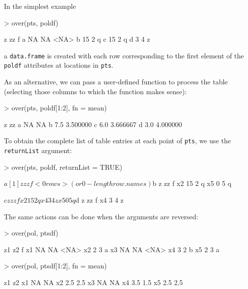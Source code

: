 \documentclass{article}
\newcommand{\code}[1]{{\tt #1}}
\begin{document}
In the simplest example 
\begin{Schunk}
\begin{Sinput}
> over(pts, poldf)
\end{Sinput}
\begin{Soutput}
   z zz    f
a NA NA <NA>
b 15  2    q
c 15  2    q
d  3  4    z
\end{Soutput}
\end{Schunk}
a \code{data.frame} is created with each row corresponding to
the first element of the \code{poldf} attributes at locations
in \code{pts}.

As an alternative, we can pass a user-defined function to process
the table (selecting those columns to which the function makes sense):
\begin{Schunk}
\begin{Sinput}
> over(pts, poldf[1:2], fn = mean)
\end{Sinput}
\begin{Soutput}
    z       zz
a  NA       NA
b 7.5 3.500000
c 6.0 3.666667
d 3.0 4.000000
\end{Soutput}
\end{Schunk}

To obtain the complete list of table entries at each point of \code{pts}, 
we use the \code{returnList} argument:
\begin{Schunk}
\begin{Sinput}
> over(pts, poldf, returnList = TRUE)
\end{Sinput}
\begin{Soutput}
$a
[1] z  zz f 
<0 rows> (or 0-length row.names)

$b
    z zz f
x2 15  2 q
x5  0  5 q

$c
    z zz f
x2 15  2 q
x4  3  4 z
x5  0  5 q

$d
   z zz f
x4 3  4 z
\end{Soutput}
\end{Schunk}

The same actions can be done when the arguments are reversed:
\begin{Schunk}
\begin{Sinput}
> over(pol, ptsdf)
\end{Sinput}
\begin{Soutput}
   z1 z2    f
x1 NA NA <NA>
x2  2  3    a
x3 NA NA <NA>
x4  3  2    b
x5  2  3    a
\end{Soutput}
\begin{Sinput}
> over(pol, ptsdf[1:2], fn = mean)
\end{Sinput}
\begin{Soutput}
    z1  z2
x1  NA  NA
x2 2.5 2.5
x3  NA  NA
x4 3.5 1.5
x5 2.5 2.5
\end{Soutput}
\end{Schunk}
\end{document}
